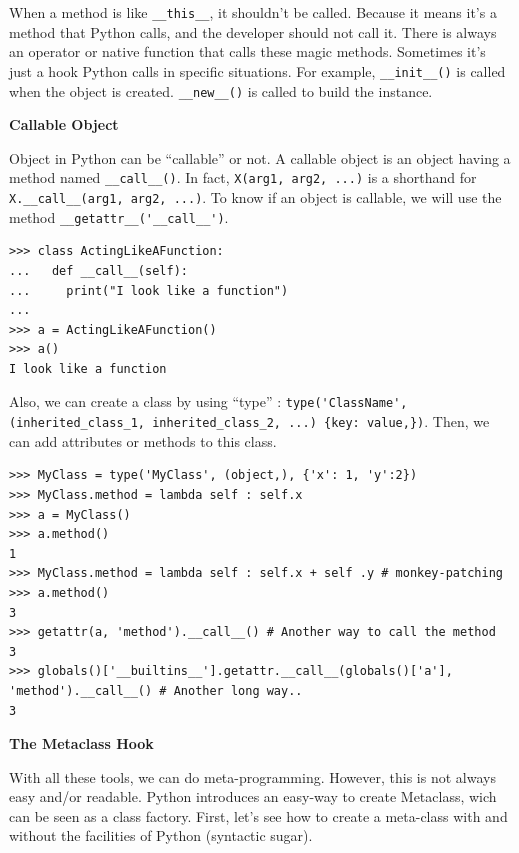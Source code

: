 \documentclass[a4paper,10pt]{article}
\begin{document}
When a method is like \lstinline|__this__|, it shouldn't be called.
Because it means it's a method that Python calls, and the developer should not call it.
There is always an operator or native function that calls these magic methods.
Sometimes it's just a hook Python calls in specific situations.
For example, \lstinline|__init__()| is called when the object is created.
\lstinline|__new__()| is called to build the instance.

\textbf{Callable Object}

Object in Python can be “callable” or not. A callable object is an object having a method named \lstinline|__call__()|. In fact, \lstinline|X(arg1, arg2, ...)| is a shorthand for \mbox{\lstinline|X.__call__(arg1, arg2, ...)|.} To know if an object is callable, we will use the method \lstinline|__getattr__('__call__')|.

\begin{lstlisting}
>>> class ActingLikeAFunction:
...   def __call__(self):
...     print("I look like a function")
...
>>> a = ActingLikeAFunction()
>>> a()
I look like a function
\end{lstlisting}

Also, we can create a class by using ``type'' : \lstinline|type('ClassName', (inherited_class_1, inherited_class_2, ...) {key: value,})|. Then, we can add attributes or methods to this class.

\begin{lstlisting}
>>> MyClass = type('MyClass', (object,), {'x': 1, 'y':2})
>>> MyClass.method = lambda self : self.x
>>> a = MyClass()
>>> a.method()
1
>>> MyClass.method = lambda self : self.x + self .y # monkey-patching
>>> a.method()
3
>>> getattr(a, 'method').__call__() # Another way to call the method
3
>>> globals()['__builtins__'].getattr.__call__(globals()['a'], 'method').__call__() # Another long way..
3
\end{lstlisting}

\textbf{The Metaclass Hook}

With all these tools, we can do meta-programming.
However, this is not always easy and/or readable.
Python introduces an easy-way to create Metaclass, wich can be seen as a class factory.
First, let's see how to create a meta-class with and without the facilities of Python (syntactic sugar).
\end{document}
